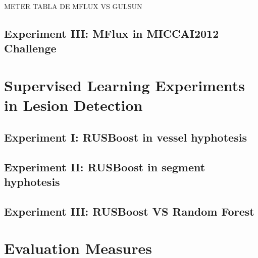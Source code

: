METER TABLA DE MFLUX VS GULSUN

\subsection{Experiment III: MFlux in MICCAI2012 Challenge}


\section{Supervised Learning Experiments in Lesion Detection}



\subsection{Experiment I: RUSBoost in vessel hyphotesis}
\subsection{Experiment II: RUSBoost in segment hyphotesis}

\subsection{Experiment III: RUSBoost VS Random Forest}
\section{Evaluation Measures}




